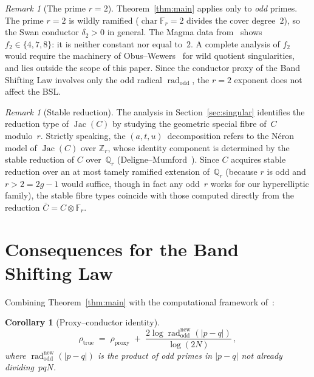 \documentclass[11pt,a4paper]{article}
\newcommand{\rad}{\operatorname{rad}}
\newcommand{\Jac}{\operatorname{Jac}}
\newcommand{\Qr}{\mathbb{Q}_r}
\newcommand{\Fr}{\mathbb{F}_r}
\newcommand{\Zr}{\mathbb{Z}_r}
\newtheorem{corollary}[theorem]{Corollary}
\theoremstyle{definition}
\theoremstyle{remark}
\newtheorem{remark}[theorem]{Remark}
\begin{document}
\begin{remark}[The prime $r = 2$]\label{rem:r2}
  Theorem~\ref{thm:main} applies only to \emph{odd} primes.
  The prime $r = 2$ is wildly ramified
  ($\operatorname{char} \Fr = 2$ divides the cover degree~$2$),
  so the Swan conductor $\delta_2 > 0$ in general.
  The Magma data from~\cite{Chen2026TCV} shows
  $f_2 \in \{4, 7, 8\}$: it is neither constant nor equal to~$2$.
  A complete analysis of $f_2$ would require the machinery of
  Obus--Wewers~\cite{ObusWewers} for wild quotient singularities,
  and lies outside the scope of this paper.
  Since the conductor proxy of the Band Shifting Law involves
  only the odd radical $\rad_{\mathrm{odd}}$, the $r = 2$
  exponent does not affect the BSL.
\end{remark}

\begin{remark}[Stable reduction]\label{rem:stable}
  The analysis in Section~\ref{sec:singular} identifies the
  reduction type of $\Jac(C)$ by studying the geometric special
  fibre of~$C$ modulo~$r$.  Strictly speaking, the
  $(a, t, u)$~decomposition refers to the N\'eron model of
  $\Jac(C)$ over $\Zr$, whose identity component is determined
  by the stable reduction of $C$ over~$\Qr$
  (Deligne--Mumford~\cite{DeligneMumford}).
  Since $C$ acquires stable reduction over an at most tamely
  ramified extension of~$\Qr$ (because $r$ is odd and
  $r > 2 = 2g - 1$ would suffice, though in fact any odd~$r$
  works for our hyperelliptic family), the stable fibre types
  coincide with those computed directly from the
  reduction $\bar{C} = C \otimes \Fr$.
\end{remark}


\section{Consequences for the Band Shifting Law}\label{sec:bsl}

Combining Theorem~\ref{thm:main} with the computational framework
of~\cite{Chen2026TCV}:

\begin{corollary}[Proxy--conductor identity]\label{cor:proxy}
  \[
    \rho_{\mathrm{true}}
    \;=\;
    \rho_{\mathrm{proxy}}
    \;+\;
    \frac{2\log\rad_{\mathrm{odd}}^{\mathrm{new}}(|p - q|)}
    {\log(2N)}\,,
  \]
  where $\rad_{\mathrm{odd}}^{\mathrm{new}}(|p - q|)$ is the
  product of odd primes in $|p - q|$ not already dividing~$pqN$.
\end{corollary}
\end{document}
